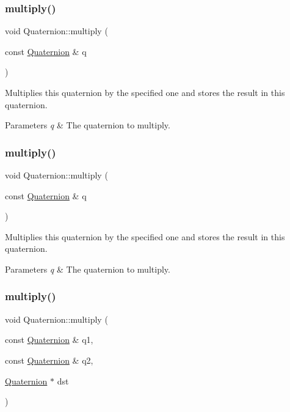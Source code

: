 \subsubsection{\texorpdfstring{multiply()}{multiply()}\hspace{0.1cm}{\footnotesize\ttfamily [1/4]}}
{\footnotesize\ttfamily void Quaternion\+::multiply (\begin{DoxyParamCaption}\item[{const \hyperlink{classQuaternion}{Quaternion} \&}]{q }\end{DoxyParamCaption})}

Multiplies this quaternion by the specified one and stores the result in this quaternion.


\begin{DoxyParams}{Parameters}
{\em q} & The quaternion to multiply. \\
\hline
\end{DoxyParams}
\mbox{\label{classQuaternion_ad4acdaaea6f57183536015a0b0aec661}} 
\subsubsection{\texorpdfstring{multiply()}{multiply()}\hspace{0.1cm}{\footnotesize\ttfamily [2/4]}}
{\footnotesize\ttfamily void Quaternion\+::multiply (\begin{DoxyParamCaption}\item[{const \hyperlink{classQuaternion}{Quaternion} \&}]{q }\end{DoxyParamCaption})}

Multiplies this quaternion by the specified one and stores the result in this quaternion.


\begin{DoxyParams}{Parameters}
{\em q} & The quaternion to multiply. \\
\hline
\end{DoxyParams}
\mbox{\label{classQuaternion_a0c8580557a603a3822b3bf5b60c75884}} 
\subsubsection{\texorpdfstring{multiply()}{multiply()}\hspace{0.1cm}{\footnotesize\ttfamily [3/4]}}
{\footnotesize\ttfamily void Quaternion\+::multiply (\begin{DoxyParamCaption}\item[{const \hyperlink{classQuaternion}{Quaternion} \&}]{q1,  }\item[{const \hyperlink{classQuaternion}{Quaternion} \&}]{q2,  }\item[{\hyperlink{classQuaternion}{Quaternion} $\ast$}]{dst }\end{DoxyParamCaption})\hspace{0.3cm}{\ttfamily [static]}}

